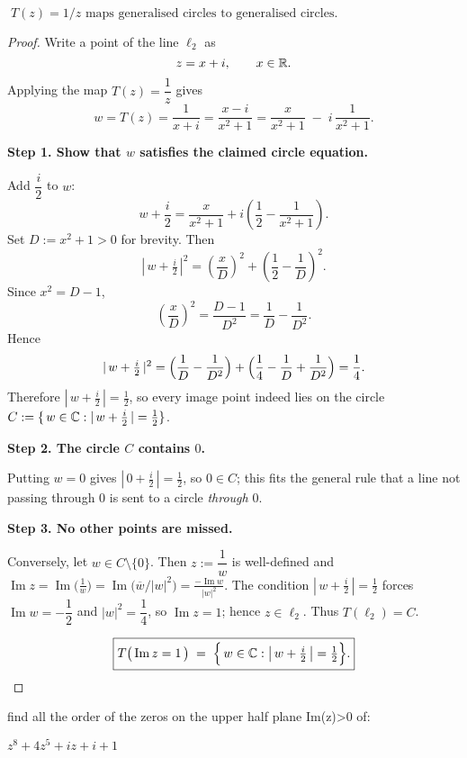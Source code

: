 \documentclass[12pt]{article}
\theoremstyle{definition} %
\theoremstyle{plain} %
\begin{document}
  \bigskip
  \centerline{$\boxed{\;T(z)=1/z\text{ maps generalised circles to generalised circles.}\;}$}

\begin{proof}
  Write a point of the line \(\ell_2\) as
  \[
     z=x+i, \qquad x\in\Bbb R.
  \]
  Applying the map \(T(z)=\dfrac1z\) gives  
  \[
     w=T(z)=\frac1{x+i}
          =\frac{x-i}{x^{2}+1}
          =\frac{x}{x^{2}+1}\;-\;i\,\frac1{x^{2}+1}.
  \]
  
  \medskip
  \noindent
  \textbf{Step 1.  Show that \(w\) satisfies the claimed circle equation.}
  
  Add \(\dfrac{i}{2}\) to \(w\):
  \[
     w+\frac{i}{2}
     =\frac{x}{x^{2}+1}
      +i\!\left(\frac12-\frac1{x^{2}+1}\right).
  \]
  Set \(D:=x^{2}+1>0\) for brevity.  Then
  \[
     |\,w+\tfrac{i}{2}\,|^{2}
     =\left(\frac{x}{D}\right)^{2}
      +\left(\frac12-\frac1{D}\right)^{2}.
  \]
  Since \(x^{2}=D-1\),
  \[
     \left(\frac{x}{D}\right)^{2}
     =\frac{D-1}{D^{2}}
     =\frac1{D}-\frac1{D^{2}}.
  \]
  Hence
  \[
     |\,w+\tfrac{i}{2}\,|^{2}
     =\Bigl(\frac1{D}-\frac1{D^{2}}\Bigr)
      +\Bigl(\frac14-\frac1{D}+\frac1{D^{2}}\Bigr)
     =\frac14.
  \]
  Therefore \(|\,w+\tfrac{i}{2}\,|=\tfrac12\), so every image point
  indeed lies on the circle
  \(C:=\{\,w\in\Bbb C:|\,w+\tfrac{i}{2}\,|=\tfrac12\}\).
  
  \medskip
  \noindent
  \textbf{Step 2.  The circle \(C\) contains \(0\).}
  
  Putting \(w=0\) gives \(|\,0+\tfrac{i}{2}\,|=\tfrac12\), so
  \(0\in C\); this fits the general rule that a line not passing through
  \(0\) is sent to a circle \emph{through} \(0\).
  
  \medskip
  \noindent
  \textbf{Step 3.  No other points are missed.}
  
  Conversely, let \(w\in C\setminus\{0\}\).
  Then \(z:=\dfrac1w\) is well-defined and
  \(
     \operatorname{Im}z
     =\operatorname{Im}\!\bigl(\tfrac1w\bigr)
     =\operatorname{Im}\!\bigl(\overline{w}/|w|^{2}\bigr)
     =\frac{-\operatorname{Im}w}{|w|^{2}}.
  \)
  The condition \(|\,w+\tfrac{i}{2}\,|=\tfrac12\) forces
  \(\operatorname{Im}w=-\dfrac12\) and \(|w|^{2}=\dfrac14\),
  so \(\operatorname{Im}z=1\); hence \(z\in\ell_2\).
  Thus \(T(\ell_2)=C\).
  
  \medskip
  \[
     \boxed{%
        T\bigl(\,\operatorname{Im}z=1\,\bigr)
        \;=\;
        \Bigl\{\,w\in\Bbb C : \bigl|\,w+\tfrac{i}{2}\,\bigr|=\tfrac12\Bigr\}.}
  \]
  
  \end{proof}

  find all the order of the zeros on the upper half plane Im(z)>0 of:

  $z^{8}+4z^{5}+iz+i+1$ 
\end{document}
